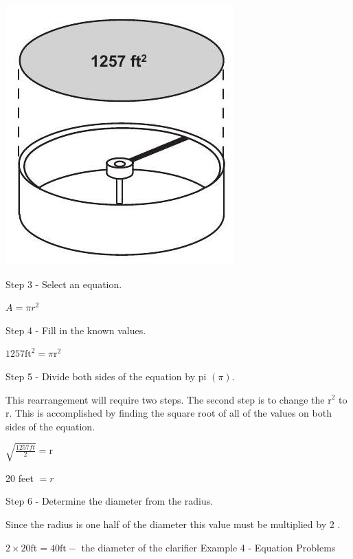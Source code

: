 \documentclass[10pt]{article}
\begin{document}
\includegraphics[max width=\textwidth]{2022_09_11_72dbedc910e6e984560cg-22(1)}

Step 3 - Select an equation.

$A=\pi r^{2}$

Step 4 - Fill in the known values.

$1257 \mathrm{ft}^{2}=\pi \mathrm{r}^{2}$

Step 5 - Divide both sides of the equation by pi $(\pi)$.

This rearrangement will require two steps. The second step is to change the $\mathrm{r}^{2}$ to $\mathrm{r}$. This is accomplished by finding the square root of all of the values on both sides of the equation.

$\sqrt{\frac{1257 f t}{2}}=\mathrm{r}$

20 feet $=r$

Step 6 - Determine the diameter from the radius.

Since the radius is one half of the diameter this value must be multiplied by 2 .

$2 \times 20 \mathrm{ft}=40 \mathrm{ft}-$ the diameter of the clarifier Example 4 - Equation Problems
\end{document}
